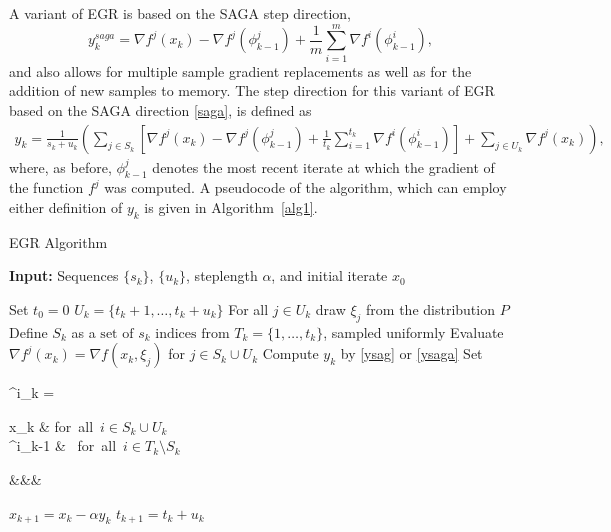\documentclass[11pt]{article}
\begin{document}
 A variant of EGR is based on the SAGA step direction,
 \begin{equation}   \label{saga} 
      y_k^{saga}= \nabla f^j(x_k) -  \nabla f^j(\phi_{k-1}^j) +\frac{1}{m}  \sum_{i=1}^{m}  \nabla f^i (\phi^i_{k-1}),
      \end{equation}
and also allows for multiple sample gradient replacements as well as for the addition of new samples to memory. The step direction for this variant of EGR based on the SAGA direction \eqref{saga}, is defined as
\begin{align}  \label{ysaga}
      y_k =  \frac{1}{s_k+u_k} \left(  \sum_{j \in S_k} \left[  \nabla f^j(x_{k}) -   \nabla f^j(\phi_{k-1}^j) + \frac{1}{t_{k}} \sum_{i = 1}^{t_{k} }  \nabla f^i (\phi^i_{k-1})  \right] + \sum_{j \in U_k}  \nabla f^j(x_k)\right),
\end{align}
 where, as before,  $\phi_{k-1}^j$ denotes the most recent iterate at which the gradient of the function $f^j$ was computed.
 A pseudocode of the algorithm, which can employ either definition of $y_k$ is given in Algorithm~\ref{alg1}.


\begin{algorithm}
	[H] 
	\caption{EGR Algorithm}
	\label{alg1}
	{\bf Input:} Sequences $\{ s_k\}$, $\{ u_k \}$, steplength $ \alpha $, and initial iterate $x_0$
	\begin{algorithmic}
		[1] 
		\State Set $t_{0} = 0$
		\State $U_k =\{t_{k}+1,\ldots, t_{k}+u_k \}$ 
		\State For  all $j \in U_k$ draw $\xi_j$ from the distribution $P$ 
		\State Define $S_k$ as a $ \mbox{set of } s_k \mbox{ indices from } T_k= \{ 1, \ldots ,t_{k}\}$, sampled uniformly
           \State Evaluate $\nabla f^j(x_k) = \nabla f(x_k, \xi_j) $ for $j \in S_k \cup U_k$
           \State Compute $y_k$ by \eqref{ysag} or \eqref{ysaga}
		\State Set \begin{flalign}  \label{chico} \qquad\quad \phi^i_k =
			\begin{cases} 
  x_k & \mbox{for all $i \in S_k\cup U_k$ } \\
  \phi^i_{k-1} &  \mbox{ for all $i \in T_k\setminus S_k$}
 \end{cases}&&&
\end{flalign}
		\State $x_{k+1} = x_k - \alpha y_k$ 
		\State $t_{k+1} = t_{k} +u_k$ 
		\EndLoop 
	\end{algorithmic}
\end{algorithm}
\end{document}
